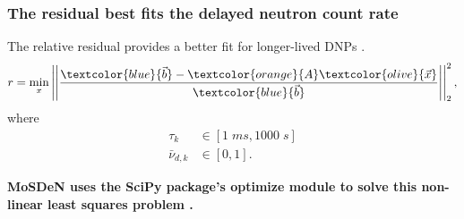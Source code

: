 \begin{frame}
  \frametitle{The residual best fits the delayed neutron count rate}
  The relative residual provides a better fit for longer-lived \glspl{DNP} \cite{keepin1957delayed}.
  \begin{equation}
    r = \min_x \left| \left| \frac{\textcolor{blue}{\vec{b}} - \textcolor{orange}{A} \textcolor{olive}{\vec{x}}}{\textcolor{blue}{\vec{b}}} \right| \right|_2^2,
  \end{equation}
  where
  \begin{align}
    \tau_k &\in [1\; ms, 1000 \;s] \nonumber \\
    \bar{\nu}_{d,k} & \in [0, 1] \nonumber.
  \end{align}

  \textbf{\gls{MoSDeN} uses the SciPy package's optimize module to solve this non-linear least squares problem \cite{scipy}.}

\end{frame}